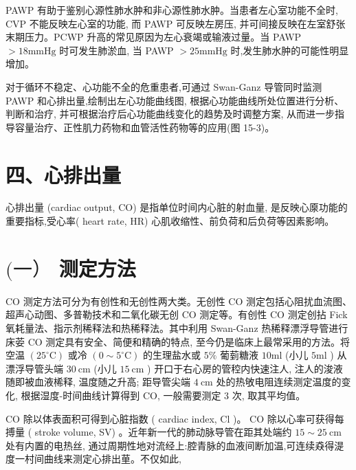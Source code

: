\documentclass[10pt]{article}
\begin{document}
PAWP 有助于鉴别心源性肺水肿和非心源性肺水肿。当患者左心室功能不全时, CVP 不能反映左心室的功能, 而 PAWP 可反映左房压, 并可间接反映在左室舒张末期压力。PCWP 升高的常见原因为左心衰竭或输液过量。当 PAWP $>18 \mathrm{mmHg}$ 时可发生肺淤血, 当 PAWP $>25 \mathrm{mmHg}$ 时,发生肺水肿的可能性明显增加。

对于循环不稳定、心功能不全的危重患者,可通过 Swan-Ganz 导管同时监测 PAWP 和心排出量,绘制出左心功能曲线图, 根据心功能曲线所处位置进行分析、判断和治疗, 并可根据治疗后心功能曲线变化的趋势及时调整方案, 从而进一步指导容量治疗、正性肌力药物和血管活性药物等的应用(图 15-3)。

\section*{四、心排出量}
心排出量 (cardiac output, CO) 是指单位时间内心脏的射血量, 是反映心厡功能的重要指标,受心率( heart rate, HR) 心肌收缩性、前负荷和后负荷等因素影响。

\section*{$(一 ）$ 测定方法}
CO 测定方法可分为有创性和无创性两大类。无创性 CO 测定包括心阻扰血流图、超声心动图、多普勒技术和二氧化碳无创 CO 测定等。有创性 CO 测定创拈 Fick 氧耗量法、指示剂稀释法和热稀释法。其中利用 Swan-Ganz 热稀释漂浮导管进行床荌 CO 测定具有安全、简便和精确的特点, 至今仍是临床上最常采用的方法。将空温 $\left(25^{\circ} \mathrm{C}\right)$ 或冷 $\left(0 \sim 5^{\circ} \mathrm{C}\right)$ 的生理盐水或 $5 \%$ 葡菿糖液 $10 \mathrm{ml}$ (小儿 $5 \mathrm{ml}$ ) 从漂浮导管头端 $30 \mathrm{~cm}$ (小儿 $15 \mathrm{~cm}$ ) 开口于右心房的管䅝内快速注人, 注人的浚液随即被血液桸释, 温度随之升高; 距导管尖端 $4 \mathrm{~cm}$ 处的热敂电阻连续测定温度的变化, 根据湿度-时间曲线计算得到 $\mathrm{CO}$, 一般需要测定 3 次, 取其平均值。

$\mathrm{CO}$ 除以体表面积可得到心脏指数 ( cardiac index, $\mathrm{Cl}$ )。 CO 除以心率可获得每搏量 ( stroke volume, SV) 。近年新一代的肺动脉导管在距其处端约 $15 \sim 25 \mathrm{~cm}$ 处有内置的电热丝, 通过周期性地对流经上:腔青脉的血液间断加温,可连续猋得湜度一村间曲线来测定心排出荲。不仅如此,
\end{document}
